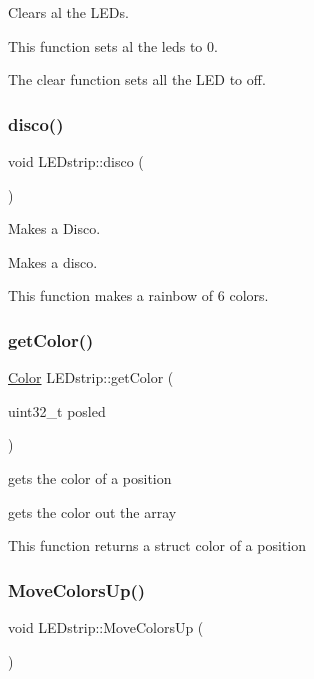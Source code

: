 Clears al the L\+E\+Ds. 

This function sets al the leds to 0.

The clear function sets all the L\+ED to off. \mbox{\label{class_l_e_dstrip_a586a43486166d3f867d50fc4e8c549ca}} 
\subsubsection{\texorpdfstring{disco()}{disco()}}
{\footnotesize\ttfamily void L\+E\+Dstrip\+::disco (\begin{DoxyParamCaption}{ }\end{DoxyParamCaption})}



Makes a Disco. 

Makes a disco.

This function makes a rainbow of 6 colors. \mbox{\label{class_l_e_dstrip_ab72d203e4a58842eb6fb985145895312}} 
\subsubsection{\texorpdfstring{get\+Color()}{getColor()}}
{\footnotesize\ttfamily \hyperlink{struct_color}{Color} L\+E\+Dstrip\+::get\+Color (\begin{DoxyParamCaption}\item[{uint32\+\_\+t}]{posled }\end{DoxyParamCaption})}



gets the color of a position 

gets the color out the array

This function returns a struct color of a position \mbox{\label{class_l_e_dstrip_af18580ebff4512a764f968771f87bcb6}} 
\subsubsection{\texorpdfstring{Move\+Colors\+Up()}{MoveColorsUp()}}
{\footnotesize\ttfamily void L\+E\+Dstrip\+::\+Move\+Colors\+Up (\begin{DoxyParamCaption}{ }\end{DoxyParamCaption})}




